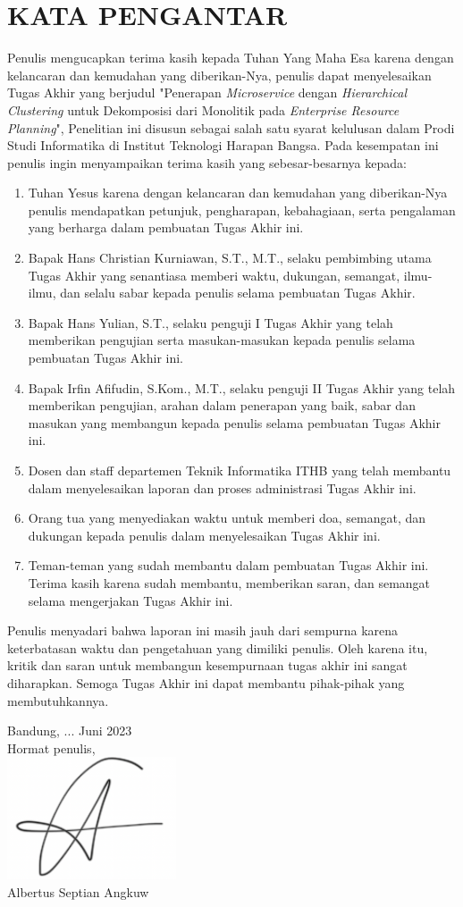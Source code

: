 \chapter*{KATA PENGANTAR}
Penulis mengucapkan terima kasih kepada Tuhan Yang Maha Esa karena dengan kelancaran dan kemudahan yang diberikan-Nya, penulis dapat menyelesaikan Tugas Akhir yang berjudul "Penerapan \textit{Microservice} dengan \textit{Hierarchical Clustering} untuk Dekomposisi dari Monolitik pada \textit{Enterprise Resource Planning}", Penelitian ini disusun sebagai salah satu syarat kelulusan dalam Prodi Studi Informatika di Institut Teknologi Harapan Bangsa. Pada kesempatan ini penulis ingin menyampaikan terima kasih yang sebesar-besarnya kepada: \\

\begin{enumerate}[nolistsep]
    \item Tuhan Yesus karena dengan kelancaran dan kemudahan yang diberikan-Nya penulis mendapatkan petunjuk, pengharapan, kebahagiaan, serta pengalaman yang berharga dalam pembuatan Tugas Akhir ini.
    \item Bapak Hans Christian Kurniawan, S.T., M.T., selaku pembimbing utama Tugas Akhir yang senantiasa memberi waktu, dukungan, semangat, ilmu-ilmu, dan selalu sabar kepada penulis selama pembuatan Tugas Akhir.
    \item Bapak Hans Yulian, S.T., selaku penguji I Tugas Akhir yang telah memberikan pengujian serta masukan-masukan kepada penulis selama pembuatan Tugas Akhir ini.
    \item Bapak Irfin Afifudin, S.Kom., M.T., selaku penguji II Tugas Akhir yang telah memberikan pengujian, arahan dalam penerapan yang baik, sabar dan masukan yang membangun kepada penulis selama pembuatan Tugas Akhir ini.
    \item Dosen dan staff departemen Teknik Informatika ITHB yang telah membantu dalam menyelesaikan laporan dan proses administrasi Tugas Akhir ini.
    \item Orang tua yang menyediakan waktu untuk memberi doa, semangat, dan dukungan kepada penulis dalam menyelesaikan Tugas Akhir ini.
    \item Teman-teman yang sudah membantu dalam pembuatan Tugas Akhir ini. Terima kasih karena sudah membantu, memberikan saran, dan semangat selama mengerjakan Tugas Akhir ini.\\
\end{enumerate}
 
Penulis menyadari bahwa laporan ini masih jauh dari sempurna karena keterbatasan waktu dan pengetahuan yang dimiliki penulis. Oleh karena itu, kritik dan saran untuk membangun kesempurnaan tugas akhir ini sangat diharapkan. Semoga Tugas Akhir ini dapat membantu pihak-pihak yang membutuhkannya.


\hfill{
\begin{flushright} Bandung, ... Juni 2023\\
Hormat  penulis,\\
\includegraphics[width=5cm]{img/sign.png}\\
Albertus Septian Angkuw
\end{flushright}}